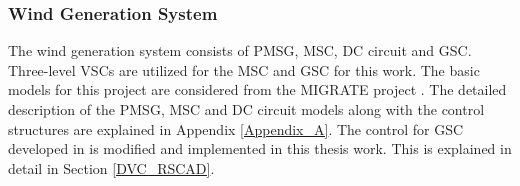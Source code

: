 \subsubsection{Wind Generation System}
The wind generation system consists of \gls{PMSG}, \gls{MSC}, \gls{DC} circuit and \gls{GSC}. Three-level \gls{VSC}s are utilized for the \gls{MSC} and \gls{GSC} for this work. The basic models for this project are considered from the MIGRATE project \cite{denis_migrate_2018}. The detailed description of the \gls{PMSG}, \gls{MSC} and \gls{DC} circuit models along with the control structures are explained in Appendix \ref{Appendix_A}. The control for \gls{GSC} developed in \cite{sethi_real-time_nodate-new} is modified and implemented in this thesis work. This is explained in detail in Section \ref{DVC_RSCAD}.

\begin{figure}[H]
\hspace{10mm}
\centering

\end{figure}
